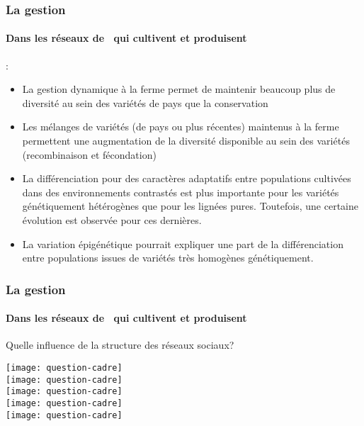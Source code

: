 \begin{frame}%
\frametitle{La gestion \insitu}
\framesubtitle{Dans les réseaux de \MSPs~qui cultivent et produisent}

:

\begin{itemize}[<+->]
\item La gestion dynamique à la ferme permet de maintenir beaucoup plus de diversité au sein des variétés de pays que la conservation \exsitu

\item Les mélanges de variétés (de pays ou plus récentes) maintenus à la ferme permettent une augmentation de la diversité disponible au sein  des variétés (recombinaison et fécondation)

\item La différenciation pour des caractères adaptatifs entre populations cultivées dans des environnements contrastés est plus importante pour les variétés génétiquement hétérogènes que pour les lignées pures.
Toutefois, une certaine évolution est observée pour ces dernières.

\item La variation épigénétique pourrait expliquer une part de la différenciation entre populations issues de variétés très homogènes génétiquement.

\end{itemize}


\end{frame}


%
%


\begin{frame}
\frametitle{La gestion \insitu}
\framesubtitle{Dans les réseaux de \MSPs~qui cultivent et produisent}

Quelle influence de la structure des réseaux sociaux?

\begin{overprint}
\centering\texttt{[image: question-cadre]}\\
\centering\texttt{[image: question-cadre]}\\
\centering\texttt{[image: question-cadre]}\\
\centering\texttt{[image: question-cadre]}\\
\centering\texttt{[image: question-cadre]}\\
\end{overprint}

\end{frame}


